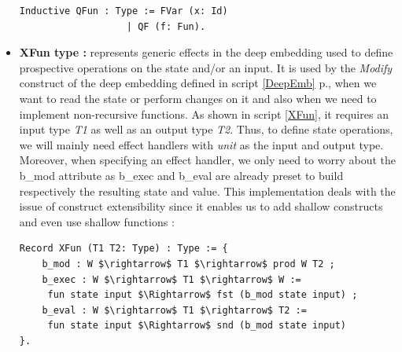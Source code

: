 \begin{itemize}
\begin{lstlisting}[caption = {Quasi-functions in the deep embedding},xleftmargin=.08\textwidth,
xrightmargin=.14\textwidth]
Inductive QFun : Type := FVar (x: Id) 
	               | QF (f: Fun).
\end{lstlisting}
	\item \textbf{XFun type :} represents generic effects in the deep embedding used to define prospective operations on the state and/or an input. It is used by the \textit{Modify} construct of the deep embedding defined in script \ref{DeepEmb} p.\pageref{DeepEmb}, when we want to read the state or perform changes on it and also when we need to implement non-recursive functions. As shown in script \ref{XFun}, it requires an input type \textit{T1} as well as an output type \textit{T2}. Thus, to define state operations, we will mainly need effect handlers with \textit{unit} as the input and output type. Moreover, when specifying an effect handler, we only need to worry about the b\_mod attribute as b\_exec and b\_eval are already preset to build respectively the resulting state and value. This implementation deals with the issue of construct extensibility since it enables us to add shallow constructs and even use shallow functions :
\begin{lstlisting}[caption = {effect handlers in the deep embedding}, label={XFun}, mathescape=true,xleftmargin=.02\textwidth,
xrightmargin=.02\textwidth]
Record XFun (T1 T2: Type) : Type := {
    b_mod : W $\rightarrow$ T1 $\rightarrow$ prod W T2 ;
    b_exec : W $\rightarrow$ T1 $\rightarrow$ W := 
     fun state input $\Rightarrow$ fst (b_mod state input) ;
    b_eval : W $\rightarrow$ T1 $\rightarrow$ T2 := 
     fun state input $\Rightarrow$ snd (b_mod state input) 
}.       
\end{lstlisting}
\end{itemize}

